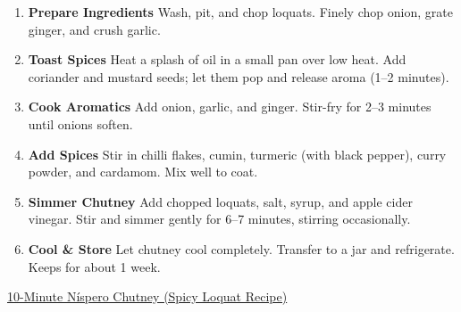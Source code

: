 \documentclass[11pt,a4paper]{article}
\begin{document}
\begin{enumerate}
  \item \textbf{Prepare Ingredients} Wash, pit, and chop loquats. Finely chop
  onion, grate ginger, and crush garlic.

  \item \textbf{Toast Spices} Heat a splash of oil in a small pan over low heat.
  Add coriander and mustard seeds; let them pop and release aroma (1--2
  minutes).

  \item \textbf{Cook Aromatics} Add onion, garlic, and ginger. Stir-fry for 2--3
  minutes until onions soften.

  \item \textbf{Add Spices} Stir in chilli flakes, cumin, turmeric (with black
  pepper), curry powder, and cardamom. Mix well to coat.

  \item \textbf{Simmer Chutney} Add chopped loquats, salt, syrup, and apple
  cider vinegar. Stir and simmer gently for 6--7 minutes, stirring occasionally.

  \item \textbf{Cool \& Store} Let chutney cool completely. Transfer to a
  jar and refrigerate. Keeps for about 1 week.

\end{enumerate}

\href{https://dishingoutplants.com/10-minute-nispero-chutney-spicy-loquat-recipe/}{10-Minute Níspero Chutney (Spicy Loquat Recipe)}
\end{document}

